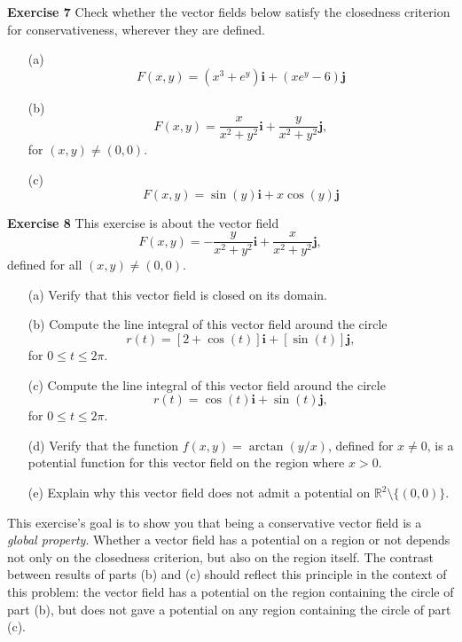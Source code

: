 \documentclass[12pt,oneside]{exam}
\newenvironment{exercise}[1]{\vspace{.1in}\noindent\textbf{Exercise #1 \hspace{.05em}}}{}
\begin{document}
\begin{exercise}{7}
Check whether the vector fields below satisfy the closedness criterion for conservativeness, wherever they are defined. 
\begin{itemize}
\item[(a)] 
\begin{equation*}
F(x,y)=(x^3+e^y)\textbf{i} + (xe^y-6)\textbf{j} 
\end{equation*}
\item[(b)] 
\begin{equation*}
F(x,y)=\frac{x}{x^2+y^2}\textbf{i} + \frac{y}{x^2+y^2}\textbf{j},
\end{equation*}
for $(x,y) \neq (0,0)$. 
\item[(c)] 
\begin{equation*}
F(x,y)=\sin(y) \textbf{i} + x\cos(y) \textbf{j} 
\end{equation*}
\end{itemize}
\end{exercise}

\begin{exercise}{8}
This exercise is about the vector field 
\begin{equation*}
F(x,y)=-\frac{y}{x^2+y^2} \textbf{i} + \frac{x}{x^2+y^2}\textbf{j}, 
\end{equation*}
defined for all $(x,y)\neq (0,0)$. 
\begin{itemize}
\item[(a)] Verify that this vector field is closed on its domain. 
\item[(b)] Compute the line integral of this vector field around the circle 
\begin{equation*}
r(t)=[2+\cos(t)]\textbf{i} + [\sin(t)] \textbf{j}, 
\end{equation*}
for $0 \leq t \leq 2\pi$. 
\item[(c)] Compute the line integral of this vector field around the circle 
\begin{equation*}
r(t)=\cos(t)\textbf{i} + \sin(t) \textbf{j},
\end{equation*}
for $0 \leq t \leq 2\pi$. 
\item[(d)] Verify that the function $f(x,y)= \arctan(y/x)$, defined for $x \neq 0$, is a potential function for this vector field on the region where $x > 0$.
\item[(e)] Explain why this vector field does not admit a potential on $\mathbb{R}^2\setminus \{(0,0)\}$. 
\end{itemize}
This exercise's goal is to show you that being a conservative vector field is a \textit{global property}. Whether a vector field has a potential on a region or not depends not only on the closedness criterion, but also on the region itself. The contrast between results of parts (b) and (c) should reflect this principle in the context of this problem: the vector field has a potential on the region containing the circle of part (b), but does not gave a potential on any region containing the circle of part (c).  
\end{exercise}
\end{document}
